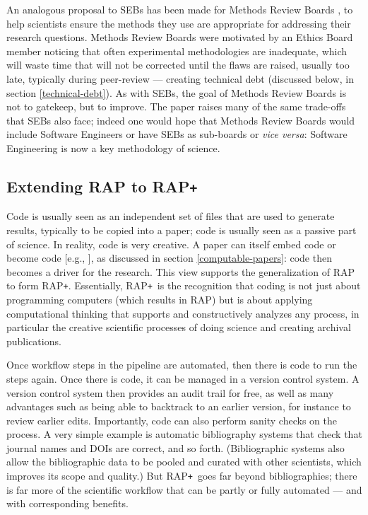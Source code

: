 \documentclass{comjnl}
\def\citeeg#1{[e.g., \citenum{#1}]}
\def\RAPstar{RAP{\tt +}}
\def\RAPstarp#1{RAP{\tt +}#1}
\begin{document}
An analogous proposal to SEBs has been made for Methods Review Boards \cite{mrb}, to help scientists ensure the methods they use are appropriate for addressing their research questions. Methods Review Boards were motivated by an Ethics Board member noticing that often experimental methodologies are inadequate, which will waste time that will not be corrected until the flaws are raised, usually too late, typically during peer-review --- creating technical debt (discussed below, in section \ref{technical-debt}). As with SEBs, the goal of Methods Review Boards is not to gatekeep, but to improve. The paper \cite{mrb} raises many of the same trade-offs that SEBs also face; indeed one would hope that Methods Review Boards would include Software Engineers or have SEBs as sub-boards or \emph{vice versa\/}: Software Engineering is now a key methodology of science.   

\subsection{Extending RAP to \RAPstar}\label{RAPstar-section}
Code is usually seen as an independent set of files that are used to generate results, typically to be copied into a paper; code is usually seen as a passive part of science. In reality, code is very creative. A paper can itself embed code or become code \citeeg{relit,Executable-Paper}, as discussed in section \ref{computable-papers}: code then becomes a driver for the research. This view supports the generalization of RAP to form \RAPstarp. Essentially, \RAPstar\ is the recognition that coding is not just about programming computers (which results in RAP) but is about applying computational thinking \cite{computational-thinking-wing,computational-thinking} that supports and constructively analyzes any process, in particular the creative scientific processes of doing science and creating archival publications.

Once workflow steps in the pipeline are automated, then there is code to run the steps again. Once there is code, it can be managed in a version control system. A version control system then provides an audit trail for free, as well as many advantages such as being able to backtrack to an earlier version, for instance to review earlier edits. Importantly, code can also perform sanity checks on the process. A very simple example is automatic bibliography systems that check that journal names and DOIs are correct, and so forth. (Bibliographic systems also allow the bibliographic data to be pooled and curated with other scientists, which improves its scope and quality.) But \RAPstar\ goes far beyond bibliographies; there is far more of the scientific workflow that can be partly or fully automated --- and with corresponding benefits.
\end{document}
